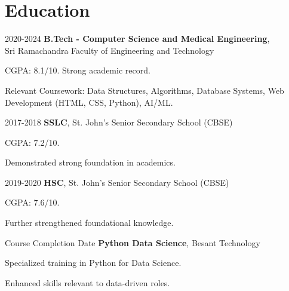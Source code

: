 \section{Education}
\begin{twocolentry}{2020-2024}
    \textbf{B.Tech - Computer Science and Medical Engineering}, \\ Sri Ramachandra Faculty of Engineering and Technology
\end{twocolentry}
\vspace{0.10 cm}
\begin{onecolentry}
    \begin{highlights}
        \item CGPA: 8.1/10.  Strong academic record.
        \item Relevant Coursework:  Data Structures, Algorithms, Database Systems, Web Development (HTML, CSS, Python),  AI/ML.
    \end{highlights}
\end{onecolentry}
\vspace{0.10 cm}
\begin{twocolentry}{2017-2018}
    \textbf{SSLC}, St. John’s Senior Secondary School (CBSE)
\end{twocolentry}
\vspace{0.10 cm}
\begin{onecolentry}
    \begin{highlights}
        \item CGPA: 7.2/10.
        \item Demonstrated strong foundation in academics.
    \end{highlights}
\end{onecolentry}
\vspace{0.10 cm}
\begin{twocolentry}{2019-2020}
    \textbf{HSC}, St. John’s Senior Secondary School (CBSE)
\end{twocolentry}
\vspace{0.10 cm}
\begin{onecolentry}
    \begin{highlights}
        \item CGPA: 7.6/10.
        \item Further strengthened foundational knowledge.
    \end{highlights}
\end{onecolentry}
\vspace{0.10 cm}
\begin{twocolentry}{Course Completion Date}
    \textbf{Python Data Science}, Besant Technology
\end{twocolentry}
\vspace{0.10 cm}
\begin{onecolentry}
    \begin{highlights}
        \item Specialized training in Python for Data Science.
        \item Enhanced skills relevant to data-driven roles.
    \end{highlights}
\end{onecolentry}

